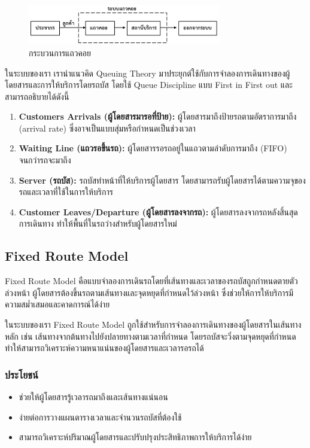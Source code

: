 \begin{figure}[h]
    \centering
    \includegraphics[width=0.75\textwidth]{Query_theory.png}
    \caption{กระบวนการแถวคอย}
    \label{fig:example}
\end{figure}
\indent ในระบบของเรา เรานำแนวคิด Queuing Theory มาประยุกต์ใช้กับการจำลองการเดินทางของผู้โดยสารและการให้บริการโดยรถบัส โดยใช้ Queue Discipline แบบ First in First out และสามารถอธิบายได้ดังนี้
\begin{enumerate}
    \item \textbf{Customers Arrivals (ผู้โดยสารมารอที่ป้าย):} ผู้โดยสารมาถึงป้ายรถตามอัตราการมาถึง (arrival rate) ซึ่งอาจเป็นแบบสุ่มหรือกำหนดเป็นช่วงเวลา
    \item \textbf{Waiting Line (แถวรอขึ้นรถ):} ผู้โดยสารรอรถอยู่ในแถวตามลำดับการมาถึง (FIFO) จนกว่ารถจะมาถึง
    \item \textbf{Server (รถบัส):} รถบัสทำหน้าที่ให้บริการผู้โดยสาร โดยสามารถรับผู้โดยสารได้ตามความจุของรถและเวลาที่ใช้ในการให้บริการ
    \item \textbf{Customer Leaves/Departure (ผู้โดยสารลงจากรถ):} ผู้โดยสารลงจากรถหลังสิ้นสุดการเดินทาง ทำให้พื้นที่ในรถว่างสำหรับผู้โดยสารใหม่
\end{enumerate}

\subsection{Fixed Route Model}
Fixed Route Model คือแบบจำลองการเดินรถโดยที่เส้นทางและเวลาของรถบัสถูกกำหนดตายตัวล่วงหน้า ผู้โดยสารต้องขึ้นรถตามเส้นทางและจุดหยุดที่กำหนดไว้ล่วงหน้า ซึ่งช่วยให้การให้บริการมีความสม่ำเสมอและคาดการณ์ได้ง่าย

\indent ในระบบของเรา Fixed Route Model ถูกใช้สำหรับการจำลองการเดินทางของผู้โดยสารในเส้นทางหลัก เช่น เส้นทางจากต้นทางไปยังปลายทางตามเวลาที่กำหนด โดยรถบัสจะวิ่งตามจุดหยุดที่กำหนด 
ทำให้สามารถวิเคราะห์ความหนาแน่นของผู้โดยสารและเวลารอรถได้

\subsubsection{ประโยชน์}
\begin{itemize}
  \item ช่วยให้ผู้โดยสารรู้เวลารถมาถึงและเส้นทางแน่นอน
  \item ง่ายต่อการวางแผนตารางเวลาและจำนวนรถบัสที่ต้องใช้
  \item สามารถวิเคราะห์ปริมาณผู้โดยสารและปรับปรุงประสิทธิภาพการให้บริการได้ง่าย
\end{itemize}

